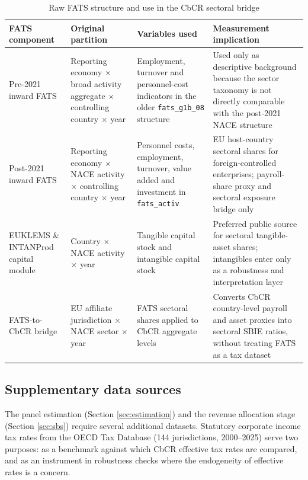 \documentclass[11pt,a4paper]{article}
\newcommand{\code}[1]{\texttt{#1}}
\begin{document}
\begin{table}[H]
\centering
\caption{Raw FATS structure and use in the CbCR sectoral bridge}
\label{tab:fats_raw_structure}
\footnotesize
\begin{tabularx}{\textwidth}{@{}L{2.8cm}L{3.2cm}L{3.8cm}X@{}}
\toprule
FATS component & Original partition & Variables used & Measurement implication \\
\midrule
Pre-2021 inward FATS & Reporting economy $\times$ broad activity aggregate $\times$ controlling country $\times$ year & Employment, turnover and personnel-cost indicators in the older \code{fats\_g1b\_08} structure & Used only as descriptive background because the sector taxonomy is not directly comparable with the post-2021 NACE structure \\
Post-2021 inward FATS & Reporting economy $\times$ NACE activity $\times$ controlling country $\times$ year & Personnel costs, employment, turnover, value added and investment in \code{fats\_activ} & EU host-country sectoral shares for foreign-controlled enterprises; payroll-share proxy and sectoral exposure bridge only \\
EUKLEMS \& INTANProd capital module & Country $\times$ NACE activity $\times$ year & Tangible capital stock and intangible capital stock & Preferred public source for sectoral tangible-asset shares; intangibles enter only as a robustness and interpretation layer \\
FATS-to-CbCR bridge & EU affiliate jurisdiction $\times$ NACE sector $\times$ year & FATS sectoral shares applied to CbCR aggregate levels & Converts CbCR country-level payroll and asset proxies into sectoral SBIE ratios, without treating FATS as a tax dataset \\
\bottomrule
\end{tabularx}
\end{table}

\subsection{Supplementary data sources}\label{sec:supplementary}

The panel estimation (Section \ref{sec:estimation}) and the revenue allocation stage (Section \ref{sec:sbs}) require several additional datasets. Statutory corporate income tax rates from the OECD Tax Database (144 jurisdictions, 2000--2025) serve two purposes: as a benchmark against which CbCR effective tax rates are compared, and as an instrument in robustness checks where the endogeneity of effective rates is a concern.
\end{document}
